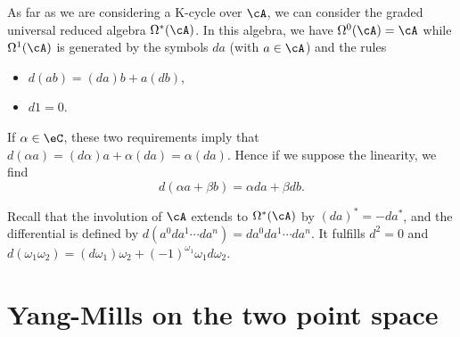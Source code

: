 As far as we are considering a K-cycle over $\cA$, we can consider the graded universal reduced algebra $\Omega^*(\cA)$. In this algebra, we have $\Omega^0(\cA)=\cA$ while $\Omega^1(\cA)$ is generated by the symbols $da$ (with $a\in\cA$) and the rules
\begin{itemize}
	\item $d(ab)=(da)b+a(db)$,
	\item $d1=0$.
\end{itemize}
If $\alpha\in\eC$, these two requirements imply that $d(\alpha a)=(d\alpha)a+\alpha(da)=\alpha(da)$. Hence if we suppose the linearity, we find
\[
	d(\alpha a+\beta b)=\alpha da+\beta db.
\]

Recall that the involution of $\cA$ extends to $\Omega^*(\cA)$ by $(da)^*=-da^*$, and the differential is defined by $d(a^0da^1\cdots da^{n})=da^0da^1\cdots da^{n}$. It fulfills $d^2=0$ and $d(\omega_1\omega_2)=(d\omega_1)\omega_2+(-1)^{\omega_1}\omega_1d\omega_2$.

\section{Yang-Mills on the two point space}

